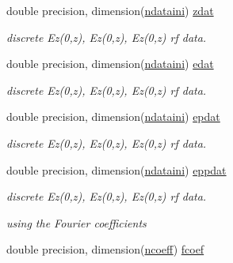 \textbf{ }\par
\begin{DoxyCompactItemize}
\item 
double precision, dimension(\mbox{\hyperlink{namespacedataclass_a2578bbe9c4dc0892ee08a8619cd7e978}{ndataini}}) \mbox{\hyperlink{namespacedataclass_aeed47a37719b1f84d885a1cb8a962081}{zdat}}
\begin{DoxyCompactList}\small\item\em discrete Ez(0,z), Ez\textquotesingle{}(0,z), Ez\textquotesingle{}\textquotesingle{}(0,z) rf data. \end{DoxyCompactList}\item 
double precision, dimension(\mbox{\hyperlink{namespacedataclass_a2578bbe9c4dc0892ee08a8619cd7e978}{ndataini}}) \mbox{\hyperlink{namespacedataclass_a67357b933079ed021a94705c576fead0}{edat}}
\begin{DoxyCompactList}\small\item\em discrete Ez(0,z), Ez\textquotesingle{}(0,z), Ez\textquotesingle{}\textquotesingle{}(0,z) rf data. \end{DoxyCompactList}\item 
double precision, dimension(\mbox{\hyperlink{namespacedataclass_a2578bbe9c4dc0892ee08a8619cd7e978}{ndataini}}) \mbox{\hyperlink{namespacedataclass_a2f77b697b14f3e0d557f044ea69402d8}{epdat}}
\begin{DoxyCompactList}\small\item\em discrete Ez(0,z), Ez\textquotesingle{}(0,z), Ez\textquotesingle{}\textquotesingle{}(0,z) rf data. \end{DoxyCompactList}\item 
double precision, dimension(\mbox{\hyperlink{namespacedataclass_a2578bbe9c4dc0892ee08a8619cd7e978}{ndataini}}) \mbox{\hyperlink{namespacedataclass_a1c9d30100962693c922470368987ec8a}{eppdat}}
\begin{DoxyCompactList}\small\item\em discrete Ez(0,z), Ez\textquotesingle{}(0,z), Ez\textquotesingle{}\textquotesingle{}(0,z) rf data. \end{DoxyCompactList}\end{DoxyCompactItemize}

\textbf{ }\par
{\em using the Fourier coefficients }\begin{DoxyCompactItemize}
\item 
double precision, dimension(\mbox{\hyperlink{namespacedataclass_aea44837b0eb59e9b5a864f3a59c7facc}{ncoeff}}) \mbox{\hyperlink{namespacedataclass_ac8605e11e3fc14fbebbc843cc36c2836}{fcoef}}
\end{DoxyCompactItemize}

